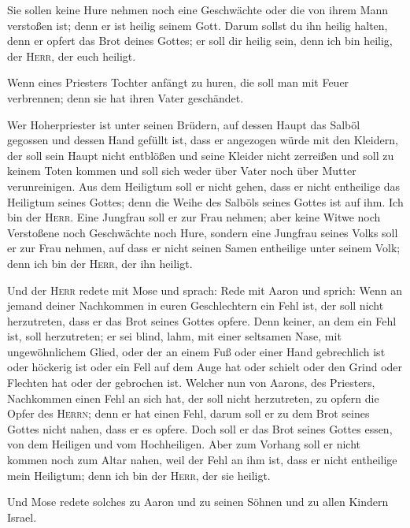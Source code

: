  Sie sollen keine Hure nehmen noch eine Geschwächte oder
die von ihrem Mann verstoßen ist; denn er ist heilig seinem Gott.
 Darum sollst du ihn heilig halten, denn er opfert das
Brot deines Gottes; er soll dir heilig sein, denn ich bin heilig, der
\textsc{Herr}, der euch heiligt.

 Wenn eines Priesters Tochter anfängt zu huren, die soll
man mit Feuer verbrennen; denn sie hat ihren Vater geschändet.

 Wer Hoherpriester ist unter seinen Brüdern, auf dessen
Haupt das Salböl gegossen und dessen Hand gefüllt ist, dass er angezogen
würde mit den Kleidern, der soll sein Haupt nicht entblößen und seine
Kleider nicht zerreißen  und soll zu keinem Toten kommen
und soll sich weder über Vater noch über Mutter verunreinigen.
 Aus dem Heiligtum soll er nicht gehen, dass er nicht
entheilige das Heiligtum seines Gottes; denn die Weihe des Salböls
seines Gottes ist auf ihm. Ich bin der \textsc{Herr}. 
Eine Jungfrau soll er zur Frau nehmen;  aber keine Witwe
noch Verstoßene noch Geschwächte noch Hure, sondern eine Jungfrau seines
Volks soll er zur Frau nehmen,  auf dass er nicht seinen
Samen entheilige unter seinem Volk; denn ich bin der \textsc{Herr}, der
ihn heiligt.

 Und der \textsc{Herr} redete mit Mose und sprach:
 Rede mit Aaron und sprich: Wenn an jemand deiner
Nachkommen in euren Geschlechtern ein Fehl ist, der soll nicht
herzutreten, dass er das Brot seines Gottes opfere.  Denn
keiner, an dem ein Fehl ist, soll herzutreten; er sei blind, lahm, mit
einer seltsamen Nase, mit ungewöhnlichem Glied,  oder der
an einem Fuß oder einer Hand gebrechlich ist  oder
höckerig ist oder ein Fell auf dem Auge hat oder schielt oder den Grind
oder Flechten hat oder der gebrochen ist.  Welcher nun
von Aarons, des Priesters, Nachkommen einen Fehl an sich hat, der soll
nicht herzutreten, zu opfern die Opfer des \textsc{Herrn}; denn er hat
einen Fehl, darum soll er zu dem Brot seines Gottes nicht nahen, dass er
es opfere.  Doch soll er das Brot seines Gottes essen,
von dem Heiligen und vom Hochheiligen.  Aber zum Vorhang
soll er nicht kommen noch zum Altar nahen, weil der Fehl an ihm ist,
dass er nicht entheilige mein Heiligtum; denn ich bin der \textsc{Herr},
der sie heiligt.

 Und Mose redete solches zu Aaron und zu seinen Söhnen
und zu allen Kindern Israel.

